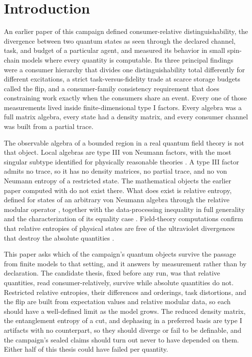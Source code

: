 \documentclass[aps,prd,reprint,nofootinbib,longbibliography]{revtex4-2}
\begin{document}
\section{Introduction}
\label{sec:intro}

An earlier paper of this campaign defined consumer-relative
distinguishability, the divergence between two quantum states as seen
through the declared channel, task, and budget of a particular agent, and
measured its behavior in small spin-chain models where every quantity is
computable.  Its three principal findings were a consumer hierarchy that
divides one distinguishability total differently for different
excitations, a strict task-versus-fidelity trade at scarce storage budgets
called the flip, and a consumer-family consistency requirement that does
constraining work exactly when the consumers share an event.  Every one of
those measurements lived inside finite-dimensional type I factors.  Every
algebra was a full matrix algebra, every state had a density matrix, and
every consumer channel was built from a partial trace.

The observable algebra of a bounded region in a real quantum field theory
is not that object.  Local algebras are type III von Neumann factors, with
the most singular subtype identified for physically reasonable theories
\cite{Fredenhagen1985, Witten2018}.  A type III factor admits no trace, so
it has no density matrices, no partial trace, and no von Neumann entropy
of a restricted state.  The mathematical objects the earlier paper
computed with do not exist there.  What does exist is relative entropy,
defined for states of an arbitrary von Neumann algebra through the
relative modular operator \cite{Araki1976}, together with the
data-processing inequality in full generality \cite{Uhlmann1977} and the
characterization of its equality case \cite{Petz1986}.  Field-theory
computations confirm that relative entropies of physical states are free
of the ultraviolet divergences that destroy the absolute quantities
\cite{Lashkari2014}.

This paper asks which of the campaign's quantum objects survive the
passage from finite models to that setting, and it answers by measurement
rather than by declaration.  The candidate thesis, fixed before any run,
was that relative quantities, read consumer-relatively, survive while
absolute quantities do not.  Restricted relative entropies, their differences and
orderings, task distortions, and the flip are built from expectation
values and relative modular data, so each should have a well-defined
limit as the model grows.  The reduced density matrix, the entanglement
entropy of a cut, and dephasing in a preferred basis are type I artifacts
with no counterpart, so they should diverge or fail to be definable, and
the campaign's sealed claims should turn out never to have depended on
them.  Either half of this thesis could have failed per quantity.
\end{document}

